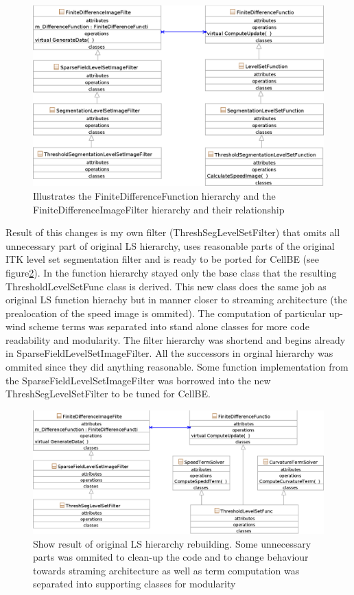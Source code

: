 \begin{figure}
    \centering
    \includegraphics[width=15cm]{data/originalHierarchy}
    \caption[Original ITK thresholding level set filter class hierarchy]{Illustrates the FiniteDifferenceFunction hierarchy and the FiniteDifferenceImageFilter hierarchy and their relationship}
    \label{fg:originalHierarchy}
\end{figure}

Result of this changes is my own filter (ThreshSegLevelSetFilter) that omits all unnecessary part of original LS hierarchy, uses reasonable parts of the original ITK level set segmentation filter and is ready to be ported for CellBE (see figure\ref{fg:resultingFilter}). In the function hierarchy stayed only the base class that the resulting ThresholdLevelSetFunc class is derived. This new class does the same job as original LS function hierachy but in manner closer to streaming architecture (the prealocation of the speed image is ommited). The computation of particular up-wind scheme terms was separated into stand alone classes for more code readability and modularity. The filter hierarchy was shortend and begins already in SparseFieldLevelSetImageFilter. All the successors in orginal hierarchy was ommited since they did anything reasonable. Some function implementation from the SparseFieldLevelSetImageFilter was borrowed into the new ThreshSegLevelSetFilter to be tuned for CellBE.

\begin{figure}
    \centering
    \includegraphics[width=15cm]{data/resultingFilter}
    \caption[Resulting level set filter ready to be ported to CellBE]{Show result of original LS hierarchy rebuilding. Some unnecessary parts was ommited to clean-up the code and to change behaviour towards straming architecture as well as term computation was separated into supporting classes for modularity}
    \label{fg:resultingFilter}
\end{figure}

